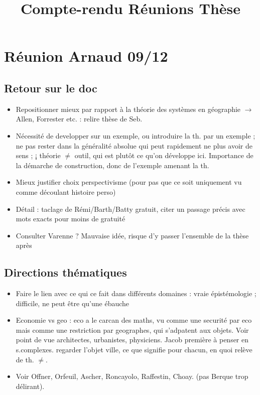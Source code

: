 


\title{Compte-rendu R{\'e}unions Th{\`e}se\bigskip\\
}
\date{}


\maketitle

\justify


\section*{R{\'e}union Arnaud 09/12}


\subsection*{Retour sur le doc}

\begin{itemize}
\item Repositionner mieux par rapport à la th{\'e}orie des syst{\`e}mes en g{\'e}ographie $\rightarrow$ Allen, Forrester etc. : relire th{\`e}se de Seb.
\item N{\'e}cessit{\'e} de developper sur un exemple, ou introduire la th. par un exemple ; ne pas rester dans la g{\'e}n{\'e}ralit{\'e} absolue qui peut rapidement ne plus avoir de sens ; ¡ th{\'e}orie $\neq$ outil, qui est plut{\^o}t ce qu'on d{\'e}veloppe ici. Importance de la d{\'e}marche de construction, donc de l'exemple amenant la th.
\item Mieux justifier choix perspectivisme (pour pas que ce soit uniquement vu comme d{\'e}coulant histoire perso)
\item D{\'e}tail : taclage de R{\'e}mi/Barth/Batty gratuit, citer un passage pr{\'e}cis avec mots exacts pour moins de gratuit{\'e}
\item Consulter Varenne ? Mauvaise id{\'e}e, risque d'y passer l'ensemble de la th{\`e}se apr{\`e}s
\end{itemize}

\subsection*{Directions th{\'e}matiques}

\begin{itemize}
\item Faire le lien avec ce qui ce fait dans diff{\'e}rents domaines : vraie {\'e}pist{\'e}mologie ; difficile, ne peut {\^e}tre qu'une {\'e}bauche
\item Economie vs geo : eco a le carcan des maths, vu comme une securit{\'e} par eco mais comme une restriction par geographes, qui s'adpatent aux objets. Voir point de vue architectes, urbanistes, physiciens. Jacob premi{\`e}re à penser en s.complexes. regarder l'objet ville, ce que signifie pour chacun, en quoi rel{\`e}ve de th. $\neq$.
\item Voir Offner, Orfeuil, Ascher, Roncayolo, Raffestin, Choay. (pas Berque trop d{\'e}lirant). 
\end{itemize}

